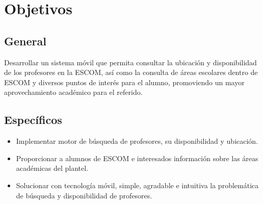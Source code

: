 \section{Objetivos}

\subsection{General}

\noindent
Desarrollar un sistema móvil que permita consultar la ubicación y disponibilidad de los profesores en la ESCOM, así como la consulta de áreas escolares dentro de ESCOM y diversos puntos de interés para el alumno, promoviendo un mayor aprovechamiento académico para el referido. 
\newline

\subsection{Específicos}
	\begin{itemize}
		\item Implementar motor de búsqueda de profesores, su disponibilidad y ubicación. 
		\item Proporcionar a alumnos de ESCOM e interesados información sobre las áreas académicas del plantel.
		\item Solucionar con tecnología móvil, simple, agradable e intuitiva la problemática de búsqueda y disponibilidad de profesores.
	\end{itemize}